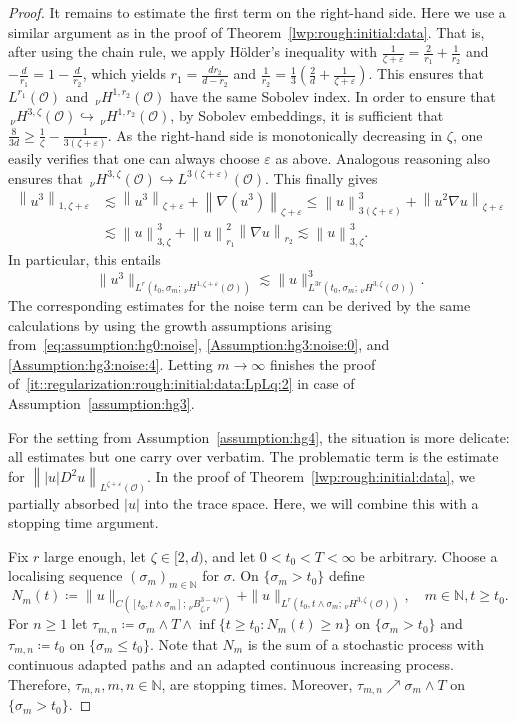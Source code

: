 \documentclass[reqno]{amsart}
\newcommand{\N}{\mathbb{N}}
\newcommand{\sO}{\mathscr{O}}
\newcommand{\ce}{\coloneqq}
\newcommand{\1}{\mathbf{1}}
\newcommand{\nH}{\ensuremath{\,_\nu H}}
\newcommand{\bpsn}[1]{\ensuremath{\nH^{#1}(\sO)}}
\newcommand{\nrm}[1]{\left\lVert #1 \right\rVert}
\begin{document}
\begin{proof}
                It remains to estimate the first term on the right-hand side. Here we use a similar argument as in the proof of Theorem~\ref{lwp:rough:initial:data}. That is, after using the chain rule, we apply Hölder's inequality with $\frac{1}{\zeta+\varepsilon}=\frac{2}{r_1}+\frac{1}{r_2}$ and $ -\frac{d}{r_1}=1-\frac{d}{r_2}$, which yields $r_1=\frac{dr_2}{d-r_2}$ and $\frac{1}{r_2}=\frac{1}{3}(\frac{2}{d}+\frac{1}{\zeta+\varepsilon})$. This ensures that $L^{r_1}(\sO)$ and $\bpsn{1,r_2}$ have the same Sobolev index. In order to ensure that $\bpsn{3,\zeta}\hookrightarrow \bpsn{1,r_2}$, by Sobolev embeddings, it is sufficient that $\frac{8}{3d}\ge \frac{1}{\zeta}-\frac{1}{3(\zeta+\varepsilon)}$. As the right-hand side is monotonically decreasing in $\zeta$, one easily verifies that one can always choose $\varepsilon$ as above. Analogous reasoning also ensures that $\bpsn{3,\zeta}\hookrightarrow L^{3(\zeta+\varepsilon)}(\sO)$. This finally gives 
                \[\begin{aligned}
                    \nrm{ u^3}_{1,\zeta+\varepsilon}&\lesssim \nrm{u^3}_{\zeta+\varepsilon}+\nrm{\nabla (u^3)}_{\zeta+\varepsilon}\le \nrm{u}_{3(\zeta+\varepsilon)}^3 +\nrm{u^2 \nabla u}_{\zeta+\varepsilon}\\
                    &\lesssim \nrm{u}_{3,\zeta}^3 + \nrm{u}^2_{r_1}\nrm{\nabla u}_{r_2}\lesssim \nrm{u}_{3,\zeta}^3.
                \end{aligned}\]
                In particular, this entails
                \[\|u^3\|_{L^r(t_0,\sigma_m;\bpsn{1,\zeta+\varepsilon})} \lesssim \|u\|_{L^{3r}(t_0,\sigma_m;\bpsn{3,\zeta})}^3.\]
                The corresponding estimates for the noise term can be derived by the same calculations by using the growth assumptions arising from~\eqref{eq:assumption:hg0:noise}, \eqref{Assumption:hg3:noise:0}, and \eqref{Assumption:hg3:noise:4}. Letting $m\to\infty$ finishes the proof of~\ref{it::regularization:rough:initial:data:LpLq:2} in case of Assumption~\ref{assumption:hg3}. 
                
                For the setting from Assumption~\ref{assumption:hg4}, the situation is more delicate: all estimates but one carry over verbatim. The problematic term is the estimate for $\nrm{|u|D^2u}_{L^{\zeta+\varepsilon}(\sO)}$. In the proof of Theorem~\ref{lwp:rough:initial:data}, we partially absorbed $|u|$ into the trace space. Here, we will combine this with a stopping time argument.
				 
				Fix $r$ large enough, let $\zeta\in [2,d)$, and let $0<t_0<T<\infty$ be arbitrary. 
				Choose a localising sequence $(\sigma_m)_{m\in \N} $ for $\sigma$. On $\{\sigma_m>t_0\}$ define 
                $$N_m(t)\ce  \|u\|_{C([t_0,t\wedge\sigma_m];\,_\nu B_{\zeta,r}^{3-4/r})}+ \|u\|_{L^r(t_0,t\wedge\sigma_m;\bpsn{3,\zeta})}, \quad m\in \N, t\ge t_0.$$
				For $n\ge 1$ let $\tau_{m,n}\ce \sigma_m\wedge T \wedge \inf\{ t\ge t_0 \colon N_m(t)\ge n\}$ on $\{\sigma_m>t_0\}$ and $\tau_{m,n}\ce t_0$ on $\{\sigma_m\le t_0\}$. Note that $N_m$ is the sum of a stochastic process with continuous adapted paths and an adapted continuous increasing process. Therefore, $\tau_{m,n}, m,n\in \N$, are stopping times. Moreover, $\tau_{m,n}\nearrow \sigma_m\wedge T$ on $\{\sigma_m >t_0\}$. 
				

\end{proof}
\end{document}
